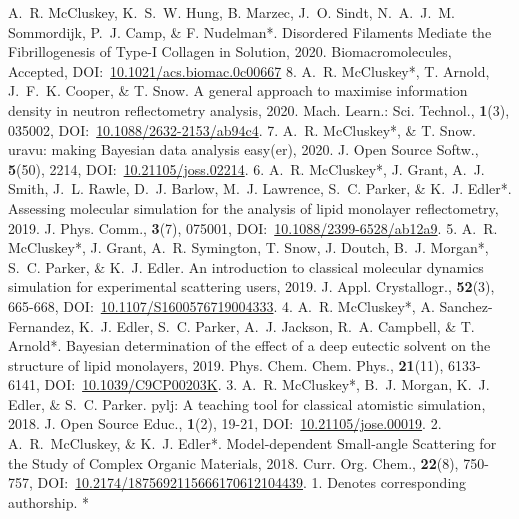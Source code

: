 \begin{cvpubys}
  \cvpuby
    {A.~R. McCluskey, K.~S.~W. Hung, B. Marzec, J.~O. Sindt, N.~A.~J.~M. Sommordijk, P.~J. Camp, \& F. Nudelman*.}
    {Disordered Filaments Mediate the Fibrillogenesis of Type-I Collagen in Solution,}
    {2020.}
    {Biomacromolecules,}
    {Accepted,}
    {DOI:~\href{https://doi.org/10.1021/acs.biomac.0c00667}{10.1021/acs.biomac.0c00667}}
    {8.}
  \cvpuby
    {A.~R. McCluskey*, T. Arnold, J.~F.~K. Cooper, \& T. Snow.}
    {A general approach to maximise information density in neutron reflectometry analysis,}
    {2020.}
    {Mach. Learn.: Sci. Technol.,}
    {\textbf{1}(3), 035002,}
    {DOI:~\href{https://doi.org/10.1088/2632-2153/ab94c4}{10.1088/2632-2153/ab94c4}.}
    {7.}
  \cvpuby
    {A.~R. McCluskey*, \& T. Snow.}
    {uravu: making Bayesian data analysis easy(er),}
    {2020.}
    {J. Open Source Softw.,}
    {\textbf{5}(50), 2214,}
    {DOI:~\href{https://doi.org/10.21105/joss.02214}{10.21105/joss.02214}.}
    {6.}
  \cvpuby
    {A.~R. McCluskey*, J. Grant, A.~J. Smith, J.~L. Rawle, D.~J. Barlow, M.~J. Lawrence, S.~C. Parker, \& K.~J. Edler*.}
    {Assessing molecular simulation for the analysis of lipid monolayer reflectometry,}
    {2019.}
    {J. Phys. Comm.,}
    {\textbf{3}(7), 075001,}
    {DOI:~\href{https://doi.org/10.1088/2399-6528/ab12a9}{10.1088/2399-6528/ab12a9}.}
    {5.}
  \cvpuby
    {A.~R. McCluskey*, J. Grant, A.~R. Symington, T. Snow, J. Doutch, B.~J. Morgan*, S.~C. Parker, \& K.~J. Edler.}
    {An introduction to classical molecular dynamics simulation for experimental scattering users,}
    {2019.}
    {J. Appl. Crystallogr.,}
    {\textbf{52}(3), 665-668,}
    {DOI:~\href{https://doi.org/10.1107/S1600576719004333}{10.1107/S1600576719004333}.}
    {4.}
  \cvpuby
    {A.~R. McCluskey*, A. Sanchez-Fernandez, K.~J. Edler, S.~C. Parker, A.~J. Jackson, R.~A. Campbell, \& T. Arnold*.}
    {Bayesian determination of the effect of a deep eutectic solvent on the structure of lipid monolayers,}
    {2019.}
    {Phys. Chem. Chem. Phys.,}
    {\textbf{21}(11), 6133-6141,}
    {DOI:~\href{https://doi.org/10.1039/C9CP00203K}{10.1039/C9CP00203K}.}
    {3.}
  \cvpuby
    {A.~R. McCluskey*, B.~J. Morgan, K.~J. Edler, \& S.~C. Parker.}
    {pylj: A teaching tool for classical atomistic simulation,}
    {2018.}
    {J. Open Source Educ.,}
    {\textbf{1}(2), 19-21,}
    {DOI:~\href{http://doi.org/10.21105/jose.00019}{10.21105/jose.00019}.}
    {2.}
  \cvpuby
    {A.~R.~McCluskey, \& K.~J. Edler*.}
    {Model-dependent Small-angle Scattering for the Study of Complex Organic Materials,}
    {2018.}
    {Curr. Org. Chem.,}
    {\textbf{22}(8), 750-757,}
    {DOI:~\href{http://doi.org/10.2174/1875692115666170612104439}{10.2174/1875692115666170612104439}.}
    {1.}
  \cvpuby
    {Denotes corresponding authorship.}
    {}
    {}
    {}
    {}
    {}
    {*}
\end{cvpubys}
